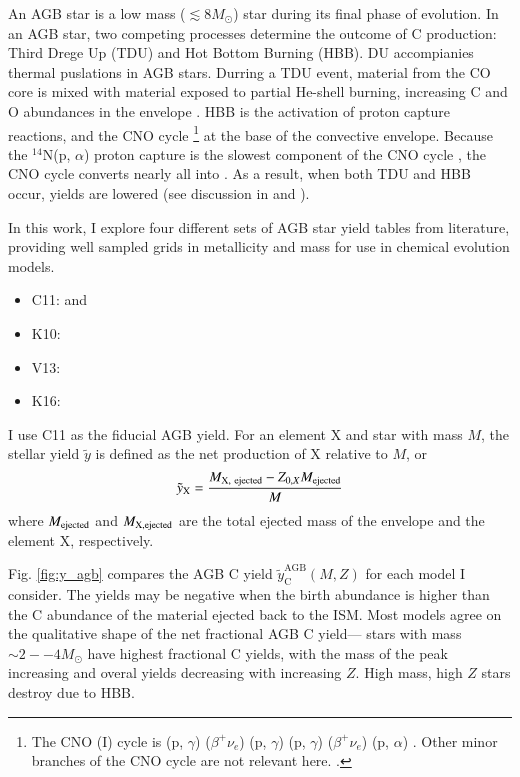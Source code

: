 \documentclass[12pt,oneside]{report}
\newcommand{\sun}{\ensuremath{\odot}}
\newcommand{\alp}{$\alpha$}
\begin{document}
An AGB star is a low mass ($\lesssim 8 M_{\sun}$) star during its final phase of evolution.  In an AGB star, two competing processes determine the outcome of C production: Third Drege Up (TDU) and Hot Bottom Burning (HBB).  DU accompianies thermal puslations in AGB stars. Durring a TDU event, material from the CO core is mixed with material exposed to partial He-shell burning, increasing C and O abundances in the envelope \citep{KL14}.
HBB is the activation of proton capture reactions, and the CNO cycle%
\footnote{The CNO (I) cycle is
(p, $\gamma$)
($\beta^+ \nu_e$)
(p, $\gamma$)
(p, $\gamma$)
($\beta^{+}\nu_e$)
(p, \alp)
.
 Other minor branches of the CNO cycle are not relevant here.
 \citep{solar-fusion}.
}
at the base of the convective envelope. Because the $^{14}$N(p, $\alpha$) proton capture is the slowest component of the CNO cycle \citep{solar-fusion}, the CNO cycle converts nearly all  into .
As a result, when both TDU and HBB occur,  yields are lowered (see discussion in \citealt{james+22} and \citealt{ventura+13}).

In this work, I explore four different sets of AGB star yield tables from literature, providing well sampled grids in metallicity and mass for use in chemical evolution models. 
\begin{itemize}
    \item C11: \citet{cristallo+11} and \citet{cristallo+15}
    \item K10: \citet{karakas10}
    \item V13: \citet{ventura+13}
    \item K16: \citet{KL16} \citet{karakas+18}
\end{itemize}
I use C11 as the fiducial AGB yield.
For an element X and star with mass $M$, the stellar yield $\tilde{y}$ is defined as the net production of X relative to $M$, or
\begin{equation}
    \tilde{y}_{\rm X} = \frac{M_{\rm X,\ ejected} - Z_{0, X} M_{\rm ejected}}{M}   
\end{equation}
where $M_{\rm ejected}$ and $M_{\rm X, ejected}$  are the total ejected mass of the envelope and the element X, respectively. 



Fig. \ref{fig:y_agb} compares the AGB C yield $\tilde{y}_\text{C}^\text{AGB}(M, Z)$ for each model I consider. 
The yields may be negative when the birth abundance is higher than the C abundance of the material ejected back to the ISM. 
Most models agree on the qualitative shape of the net fractional AGB C yield---%
stars with mass $\sim 2--4 M_\odot$ have highest fractional C yields, with the mass of the peak increasing and overal yields decreasing with increasing $Z$.  High mass, high $Z$ stars destroy  due to HBB.
\end{document}
